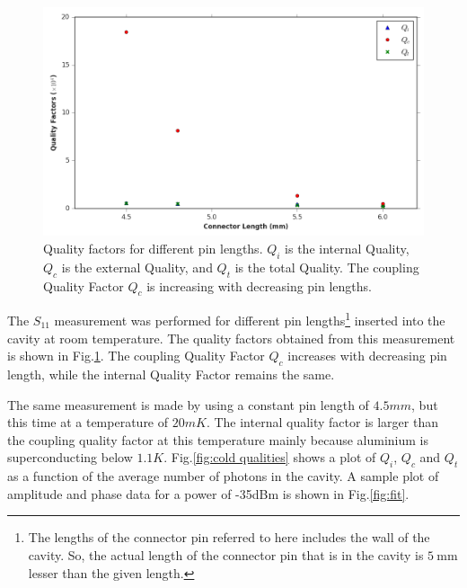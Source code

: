 \begin{figure}
\centering
\includegraphics[width=\linewidth]{Figures/diff_lengths.png}
\decoRule
\caption[Quality Factors for different pin lengths]{Quality factors for different pin lengths. $Q_i$ is the internal Quality, $Q_c$ is the external Quality, and $Q_t$ is the total Quality. The coupling Quality Factor $Q_c$ is increasing with decreasing pin lengths.}
\label{fig:diff lengths}
\end{figure}

The $S_{11}$ measurement was performed for different pin lengths\footnote{The lengths of the connector pin referred to here includes the wall of the cavity. So, the actual length of the connector pin that is in the cavity is $\SI{5}{\milli\meter}$ lesser than the given length.} inserted into the cavity at room temperature. The quality factors obtained from this measurement is shown in Fig.\ref{fig:diff lengths}. The coupling Quality Factor $Q_c$ increases with decreasing pin length, while the internal Quality Factor remains the same.

The same measurement is made by using a constant pin length of $4.5 mm$, but this time at a temperature of $20mK$. The internal quality factor is larger than the coupling quality factor at this temperature mainly because aluminium is superconducting below $1.1K$. Fig.\ref{fig:cold qualities} shows a plot of $Q_i$, $Q_c$ and $Q_t$ as a function of the average number of photons in the cavity. A sample plot of amplitude and phase data for a power of -35dBm is shown in Fig.\ref{fig:fit}.

